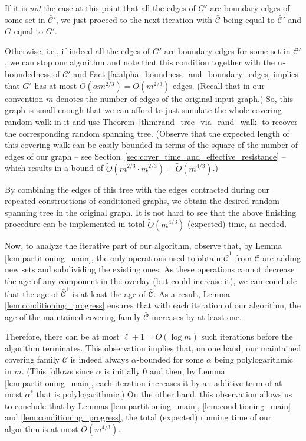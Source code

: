 \documentclass[11pt, letterpaper]{article}
\newcommand{\ocC}{\bar{\mathcal{C}}}
\newcommand{\tO}{\widetilde{O}}
\begin{document}
If it is {\em not} the case at this point that all the edges of $G'$ are boundary edges of some set in $\ocC'$, we just proceed to the next iteration with $\ocC$ being equal to $\ocC'$ and $G$ equal to $G'$. 

Otherwise, i.e., if indeed all the edges of $G'$ are boundary edges for some set in $\ocC'$, we can stop our algorithm and note that this condition together with the $\alpha$-boundedness of $\ocC'$ and Fact \ref{fa:alpha_boundness_and_boundary_edges} implies that $G'$ has at most $O(\alpha m^{2/3})=\tO(m^{2/3})$ edges. (Recall that in our convention $m$ denotes the number of edges of the original input graph.) So, this graph is small enough that we can afford to just simulate the whole covering random walk in it and use Theorem~\ref{thm:rand_tree_via_rand_walk} to recover the corresponding random spanning tree. (Observe that the expected length of this covering walk can be easily bounded in terms of the square of the number of edges of our graph -- see Section~\ref{sec:cover_time_and_effective_resistance} -- which results in a bound of $\tO(m^{2/3}\cdot m^{2/3})=\tO(m^{4/3})$.) 

By combining the edges of this tree with the edges contracted during our repeated constructions of conditioned graphs, we obtain the desired random spanning tree in the original graph. It is not hard to see that the above finishing procedure can be implemented in total $\tO(m^{4/3})$ (expected) time, as needed.

Now, to analyze the iterative part of our algorithm, observe that, by Lemma \ref{lem:partitioning_main}, the only operations used to obtain $\ocC^1$ from $\ocC$ are adding new sets and subdividing the existing ones. As these operations cannot decrease the age of any component in the overlay (but could increase it), we can conclude that the age of $\ocC^1$ is at least the age of $\ocC$. As a result, Lemma \ref{lem:conditioning_progress} ensures that with each iteration of our algorithm, the age of the maintained covering family $\ocC$ increases by at least one. 

Therefore, there can be at most $\ell+1=O(\log m)$ such iterations before the algorithm terminates. This observation implies that, on one hand, our maintained covering family $\ocC$ is indeed always $\alpha$-bounded for some $\alpha$ being polylogarithmic in $m$. (This follows since $\alpha$ is initially $0$ and then, by Lemma \ref{lem:partitioning_main}, each iteration increases it by an additive term of at most $\alpha^*$ that is polylogarithmic.) On the other hand, this observation allows us to conclude that by Lemmas \ref{lem:partitioning_main}, \ref{lem:conditioning_main} and \ref{lem:conditioning_progress}, the total (expected) running time of our algorithm is at most $\tO(m^{4/3})$. 
\end{document}
